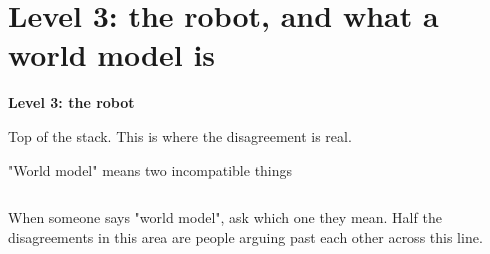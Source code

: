 \documentclass[aspectratio=169]{beamer}
\begin{document}
\section{Level 3: the robot, and what a world model is}

\begin{frame}[plain]
  \vfill
  \begin{center}
    {\Large\color{popblue}\textbf{Level 3: the robot}}\\[0.9em]
    \begin{minipage}{0.82\textwidth}\centering\small
      Top of the stack. This is where the disagreement is real.
    \end{minipage}
  \end{center}
  \vfill
\end{frame}

\begin{frame}{"World model" means two incompatible things}
  \small
  \begin{columns}[T]
  \end{columns}
  \vskip 10pt
  \centering\small
  When someone says "world model", ask which one they mean. Half the disagreements in this
  area are people arguing past each other across this line.
\end{frame}
\end{document}
